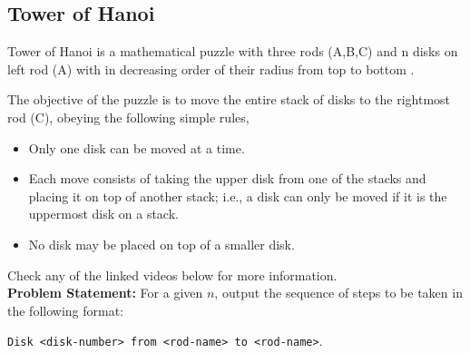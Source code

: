 \documentclass[../../Problems]{subfiles}
\begin{document}
\recalctypearea
\subsection{Tower of Hanoi}
Tower of Hanoi is a mathematical puzzle with three rods (A,B,C) and n disks on left rod (A) with in decreasing
order of their radius from top to bottom .

The objective of the puzzle is to move the entire stack of disks to the
rightmost rod (C), obeying the following simple rules,
\begin{itemize}
	\item Only one disk can be moved at a time.
	\item Each move consists of taking the upper disk from one of the stacks and placing it on top of another stack; i.e., a disk can only be moved if it is the uppermost disk on a stack.
	\item No disk may be placed on top of a smaller disk.
\end{itemize}
Check any of the linked videos below for more information.\\
\textbf{Problem Statement:}
For a given $n$, output the sequence of steps to be taken in the following format:

\verb!Disk <disk-number> from <rod-name> to <rod-name>!.
\end{document}
